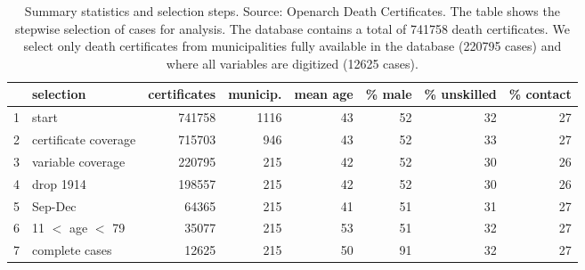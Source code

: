 \begin{table}[ht]
\centering
\begin{tabular}{rlrrrrrr}
  \hline
 & selection & certificates & municip. & mean age & \% male & \% unskilled & \% contact \\ 
  \hline
1 & start & 741758 & 1116 & 43 & 52 & 32 & 27 \\ 
  2 & certificate coverage & 715703 & 946 & 43 & 52 & 33 & 27 \\ 
  3 & variable coverage & 220795 & 215 & 42 & 52 & 30 & 26 \\ 
  4 & drop 1914 & 198557 & 215 & 42 & 52 & 30 & 26 \\ 
  5 & Sep-Dec & 64365 & 215 & 41 & 51 & 31 & 27 \\ 
  6 & 11 $<$ age $<$ 79 & 35077 & 215 & 53 & 51 & 32 & 27 \\ 
  7 & complete cases & 12625 & 215 & 50 & 91 & 32 & 27 \\ 
   \hline
\end{tabular}
\caption{Summary statistics and selection steps. Source: Openarch Death Certificates. The table shows the stepwise selection of cases for analysis. The database contains a total of 741758 death certificates. We select only death certificates from municipalities fully available in the database (220795 cases) and where all variables are digitized (12625 cases).} 
\label{sumselect}
\end{table}
